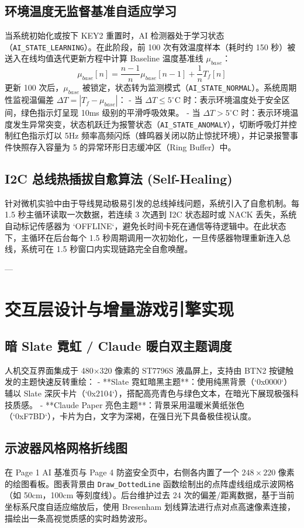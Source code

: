\documentclass[11pt,a4paper]{ctexart}
\begin{document}
\subsection{环境温度无监督基准自适应学习}
当系统初始化或按下 KEY2 重置时，AI 检测器处于学习状态（\texttt{AI\_STATE\_LEARNING}）。在此阶段，前 100 次有效温度样本（耗时约 150 秒）被送入在线均值迭代更新方程中计算 Baseline 温度基准线 $\mu_{base}$：
$$\mu_{base}[n] = \frac{n-1}{n}\mu_{base}[n-1] + \frac{1}{n}T_f[n]$$
更新 100 次后，$\mu_{base}$ 被锁定，状态转为监测模式（\texttt{AI\_STATE\_NORMAL}）。系统周期性监视温偏差 $\Delta T = |T_f - \mu_{base}|$：
- 当 $\Delta T \le 5^\circ\text{C}$ 时：表示环境温度处于安全区间，绿色指示灯呈现 10ms 级别的平滑呼吸效果。
- 当 $\Delta T > 5^\circ\text{C}$ 时：表示环境温度发生异常突变，状态机跃迁为报警状态（\texttt{AI\_STATE\_\allowbreak ANOMALY}），切断呼吸灯并控制红色指示灯以 5Hz 频率高频闪烁（蜂鸣器关闭以防止惊扰环境），并记录报警事件快照存入容量为 5 的异常环形日志缓冲区（Ring Buffer）中。

\subsection{I2C 总线热插拔自愈算法 (Self-Healing)}
针对微机实验中由于导线晃动极易引发的总线掉线问题，系统引入了自愈机制。每 1.5 秒主循环读取一次数据，若连续 3 次遇到 I2C 状态超时或 NACK 丢失，系统自动标记传感器为 `OFFLINE`，避免长时间卡死在通信等待逻辑中。在此状态下，主循环在后台每个 1.5 秒周期调用一次初始化，一旦传感器物理重新连入总线，系统可在 1.5 秒窗口内实现链路完全自愈唤醒。

---

\section{交互层设计与增量游戏引擎实现}

\subsection{暗 Slate 霓虹 / Claude 暖白双主题调度}
人机交互界面集成于 480×320 像素的 ST7796S 液晶屏上，支持由 BTN2 按键触发的主题快速反转重绘：
- **Slate 霓虹暗黑主题**：使用纯黑背景（`0x0000`）辅以 Slate 深灰卡片（`0x2104`），搭配高亮青色与绿色文本，在暗光下展现极强科技质感。
- **Claude Paper 亮色主题**：背景采用温暖米黄纸张色（`0xF7BD`），卡片为白，文字为深褐，在强日光下具备极佳视认度。

\subsection{示波器风格网格折线图}
在 Page 1 AI 基准页与 Page 4 防盗安全页中，右侧各内置了一个 $248 \times 220$ 像素的绘图看板。图表背景由 \texttt{Draw\_DottedLine} 函数绘制出的点阵虚线组成示波网格（如 50cm，100cm 等刻度线）。后台维护过去 24 次的偏差/距离数据，基于当前坐标系尺度自适应缩放后，使用 Bresenham 划线算法进行点对点高速像素连接，描绘出一条高视觉质感的实时趋势波形。
\end{document}
